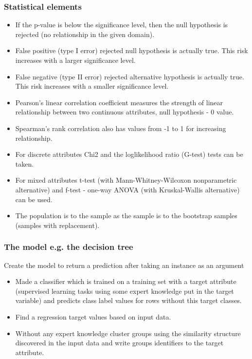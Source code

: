 \documentclass{beamer}
\begin{document}
\begin{frame}
\footnotesize 
\frametitle{Statistical elements}
\begin{block}{}
\begin{itemize}
\item If the p-value is below the significance level, then the null hypothesis is rejected (no relationship in the given domain).
\item False positive (type I error) rejected null hypothesis is actually true. This risk increases with a larger significance level.
\item False negative (type II error) rejected alternative hypothesis is actually true. This risk increases with a smaller significance level.
\item Pearson's linear correlation coefficient measures the strength of linear relationship between two continuous attributes, null hypothesis - 0 value.
\item Spearman's rank correlation also has values from -1 to 1 for increasing relationship.
\item For discrete attributes Chi2 and the loglikelihood ratio (G-test) tests can be taken.
\item For mixed attributes t-test (with Mann-Whitney-Wilcoxon nonparametric alternative) and f-test - one-way ANOVA (with Kruskal-Wallis alternative) can be used.
\item The population is to the sample as the sample is to the bootstrap samples (samples with replacement).
\end{itemize}
\end{block}
\end{frame}

\begin{frame}
\frametitle{The model e.g. the decision tree}
\begin{block}{Create the model to return a prediction after taking an instance as an argument}
\begin{itemize}
\item Made a classifier which is trained on a training set with a target attribute (supervised learning tasks using some expert knowledge put in the target variable) and predicts class label values for rows without this target classes. 
\item Find a regression target values based on input data.
\item Without any expert knowledge cluster groups using the similarity structure discovered in the input data and write groups identifiers to the target attribute.
\end{itemize}
\end{block}
\end{frame}
\end{document}
